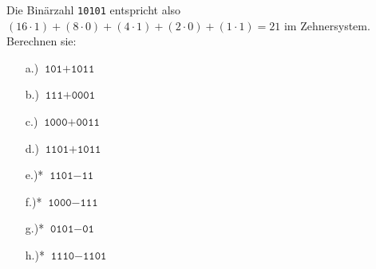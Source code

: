 \documentclass[a4paper,12pt]{article}
\begin{document}
Die Binärzahl \texttt{10101} entspricht also
$(16\cdot 1)+(8\cdot 0)+(4\cdot 1)+(2\cdot 0)+(1\cdot 1)=21$ im
Zehnersystem. Berechnen sie:


\noindent\parbox[t]{2.4in}{\raggedright%

\begin{enumerate}[label=\alph*.)]
\item[a.)] $\texttt{101}+\texttt{1011}$
\item[b.)] $\texttt{111}+\texttt{0001}$
\item[c.)] $\texttt{1000}+\texttt{0011}$
\item[d.)] $\texttt{1101}+\texttt{1011}$
\end{enumerate}
}%
\parbox[t]{2.4in}{\raggedright%

\begin{enumerate}[label=\alph*.)]
\setcounter{enumi}{4}
\item[e.)*] $\texttt{1101}-\texttt{11}$
\item[f.)*] $\texttt{1000}-\texttt{111}$
\item[g.)*] $\texttt{0101}-\texttt{01}$
\item[h.)*] $\texttt{1110}-\texttt{1101}$

\end{enumerate}
}







\end{document}
